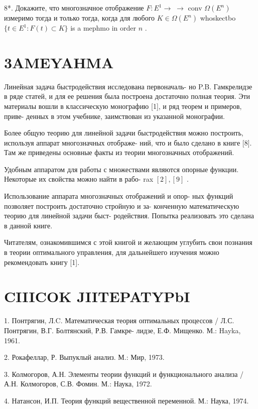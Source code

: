 \documentclass[8pt]{extarticle}
\begin{document}
8*. Докажите, что многозначное отображение \(F : {E}^{1} \rightarrow \; \rightarrow\) conv \(\Omega \left( {E}^{n}\right)\) измеримо тогда и только тогда, когда для любого \(K \in  \Omega \left( {E}^{n}\right)\) whoskectbo \(\{ t \in  {E}^{1} : F\left( t\right)  \subset  K\}\) is a mephmo in order \(n\) .

\section*{3AMEYAHMA}

Линейная задача быстродействия исследована первоначаль- но P.B. Гамкрелидзе в ряде статей, и для ее решения была построена достаточно полная теория. Эти материалы вошли в классическую монографию [1], и ряд теорем и примеров, приве- денных в этом учебнике, заимствован из указанной монографии.

Более общую теорию для линейной задачи быстродействия можно построить, используя аппарат многозначных отображе- ний, что и было сделано в книге [8]. Там же приведены основные факты из теории многозначных отображений.

Удобным аппаратом для работы с множествами являются опорные функции. Некоторые их свойства можно найти в рабо- rax \(\left\lbrack  2\right\rbrack  ,\left\lbrack  9\right\rbrack\) .

Использование аппарата многозначных отображений и опор- ных функций позволяет построить достаточно стройную и за- конченную математическую теорию для линейной задачи быст- родействия. Попытка реализовать это сделана в данной книге.

Читателям, ознакомившимся с этой книгой и желающим углубить свои познания в теории оптимального управления, для дальнейшего изучения можно рекомендовать книгу [1].

\section*{CIIICOK JIITEPATYPbI}

1. Понтрягин, Л.C. Математическая теория оптимальных процессов / Л.С. Понтрягин, В.Г. Болтянский, Р.В. Гамкре- лидзе, Е.Ф. Мищенко. М.: Hayka, 1961.

2. Рокафеллар, Р. Выпуклый анализ. М.: Мир, 1973.

3. Колмогоров, А.Н. Элементы теории функций и функционального анализа / А.Н. Колмогоров, С.В. Фомин. М.: Наука, 1972.

4. Натансон, И.П. Теория функций вещественной переменной. М.: Наука, 1974.
\end{document}

